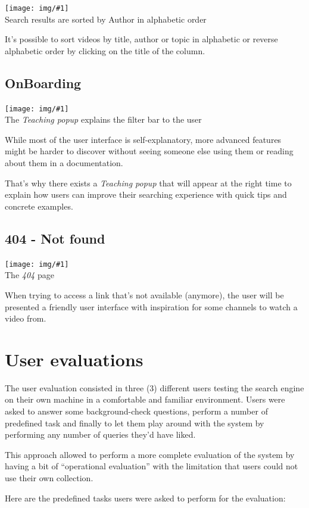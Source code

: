 \documentclass[12pt]{exam}
\newcommand{\pic}[2]{{
\begin{center}
\texttt{[image: img/\#1]} \\
{#2}
\end{center}
}}
\begin{document}
\pic{se_sorting}{Search results are sorted by Author in alphabetic order}

It's possible to sort videos by title, author or topic in alphabetic 
or reverse alphabetic order by clicking on the title of the column.

\subsection{OnBoarding}

\pic{se_onboarding}{
The \textit{Teaching popup} explains the filter bar to the user
}

While most of the user interface is self-explanatory, more advanced features
might be harder to discover without seeing someone else using them or
reading about them in a documentation.

That's why there exists a \textit{Teaching popup} that will appear at the
right time to explain how users can improve their searching experience with
quick tips and concrete examples.

\subsection{404 - Not found}

\pic{se_fourzerofour}{The \textit{404} page}

When trying to access a link that's not available (anymore), the
user will be presented a friendly user interface with inspiration
for some channels to watch a video from.

\newpage

\section{User evaluations}

The user evaluation consisted in three (3) different users
testing the search engine on their own machine in a comfortable and
familiar environment. Users were asked to answer some background-check
questions, perform a number of predefined task and finally to let them play
around with the system by performing any number of queries they'd have liked.

This approach allowed to perform a more complete evaluation of the system by
having a bit of ``operational evaluation'' with the limitation that users could
not use their own collection.

Here are the predefined tasks users were asked to perform for the evaluation:
\end{document}
